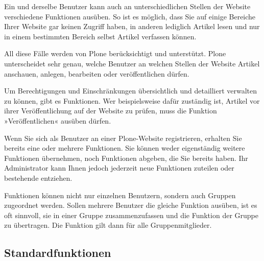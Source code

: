 \documentclass[a4paper,12pt,ngerman]{manual}
\begin{document}
Ein und derselbe Benutzer kann auch an unterschiedlichen Stellen der
Website verschiedene Funktionen ausüben. So ist es möglich, dass Sie
auf einige Bereiche Ihrer Website gar keinen Zugriff haben, in anderen
lediglich Artikel lesen und nur in einem bestimmten Bereich selbst
Artikel verfassen können.

All diese Fälle werden von Plone berücksichtigt und unterstützt. Plone
unterscheidet sehr genau, welche Benutzer an welchen Stellen der
Website Artikel anschauen, anlegen, bearbeiten oder veröffentlichen
dürfen.

Um Berechtigungen und Einschränkungen übersichtlich und detailliert
verwalten zu können, gibt es Funktionen. Wer beispielsweise dafür
zuständig ist, Artikel vor ihrer Veröffentlichung auf der Website zu
prüfen, muss die Funktion »Veröffentlichen« ausüben dürfen.

Wenn Sie sich als Benutzer an einer Plone-Website registrieren, erhalten Sie
bereits eine oder mehrere Funktionen. Sie können weder eigenständig weitere
Funktionen übernehmen, noch Funktionen abgeben, die Sie bereits haben. Ihr
Administrator kann Ihnen jedoch jederzeit neue Funktionen zuteilen oder
bestehende entziehen.

Funktionen können nicht nur einzelnen Benutzern, sondern auch Gruppen
zugeordnet werden. Sollen mehrere Benutzer die gleiche Funktion
ausüben, ist es oft sinnvoll, sie in einer Gruppe zusammenzufassen und
die Funktion der Gruppe zu übertragen. Die Funktion gilt dann für alle
Gruppenmitglieder.


\subsection{Standardfunktionen}
\end{document}
